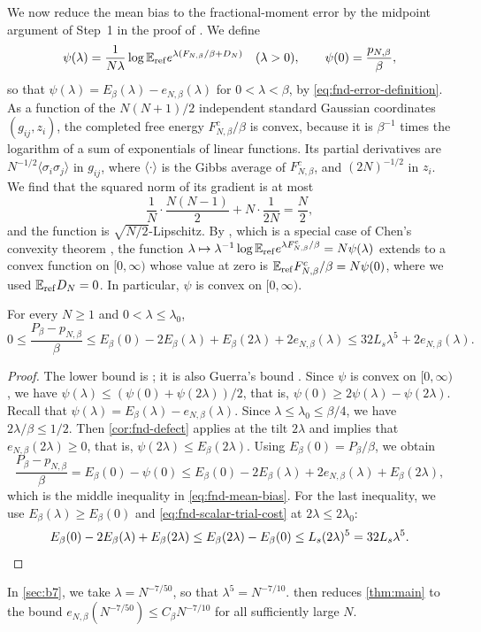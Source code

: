We now reduce the mean bias to the fractional-moment error by the
midpoint argument of Step~1 in the proof of \cite[Theorem~7.8]{AL}. We
define
\[
 \psi(\lambda)=\frac1{N\lambda}
       \log\mathbb E_{\rm ref}e^{\lambda(F_{N,\beta}/\beta+D_N)}\quad(\lambda>0),
 \qquad\psi(0)=\frac{p_{N,\beta}}\beta ,
\]
so that $\psi(\lambda)=E_\beta(\lambda)-e_{N,\beta}(\lambda)$ for
$0<\lambda<\beta$, by \eqref{eq:fnd-error-definition}. As a function
of the $N(N+1)/2$ independent standard Gaussian coordinates
$(g_{ij},z_i)$, the completed free energy $F^c_{N,\beta}/\beta$ is
convex, because it is $\beta^{-1}$ times the logarithm of a sum of
exponentials of linear functions. Its partial derivatives are
$N^{-1/2}\langle\sigma_i\sigma_j\rangle$ in $g_{ij}$, where
$\langle\cdot\rangle$ is the Gibbs average of $F^c_{N,\beta}$, and
$(2N)^{-1/2}$ in $z_i$. We find that the squared norm of its gradient is
at most
\[
 \frac1N\cdot\frac{N(N-1)}2+N\cdot\frac1{2N}=\frac N2,
\]
and the function is $\sqrt{N/2}$-Lipschitz. By \cite[Lemma~5.2]{AL}, which is a
special case of Chen's convexity theorem \cite[Theorem~1]{ChenConvexity},
the function
$\lambda\mapsto\lambda^{-1}\log\mathbb E_{\rm ref}e^{\lambda F^c_{N,\beta}/\beta}=N\psi(\lambda)$
extends to a convex function on $[0,\infty)$ whose value at zero is
$\mathbb E_{\rm ref}F^c_{N,\beta}/\beta=N\psi(0)$, where we used
$\mathbb E_{\rm ref}D_N=0$. In particular, $\psi$ is convex on $[0,\infty)$.

\begin{proposition}\label{prop:fnd-mean-bias}
For every $N\ge1$ and $0<\lambda\le\lambda_0$,
\begin{equation}\label{eq:fnd-mean-bias}
 0\le\frac{P_\beta-p_{N,\beta}}\beta
 \le E_\beta(0)-2E_\beta(\lambda)+E_\beta(2\lambda)
                         +2e_{N,\beta}(\lambda)
 \le 32L_s\lambda^5+2e_{N,\beta}(\lambda).
\end{equation}
\end{proposition}

\begin{proof}
The lower bound is \cite[Theorem~1.1, (1.5)]{AL}; it is also Guerra's
bound \cite{Guerra2003}. Since $\psi$ is convex on $[0,\infty)$, we have
$\psi(\lambda)\le(\psi(0)+\psi(2\lambda))/2$, that is,
$\psi(0)\ge2\psi(\lambda)-\psi(2\lambda)$. Recall that
$\psi(\lambda)=E_\beta(\lambda)-e_{N,\beta}(\lambda)$. Since
$\lambda\le\lambda_0\le\beta/4$, we have $2\lambda/\beta\le1/2$. Then
\cref{cor:fnd-defect} applies at the tilt $2\lambda$ and implies that
$e_{N,\beta}(2\lambda)\ge0$, that is, $\psi(2\lambda)\le E_\beta(2\lambda)$.
Using $E_\beta(0)=P_\beta/\beta$, we obtain
\[
 \frac{P_\beta-p_{N,\beta}}\beta=E_\beta(0)-\psi(0)
 \le E_\beta(0)-2E_\beta(\lambda)+2e_{N,\beta}(\lambda)+E_\beta(2\lambda),
\]
which is the middle inequality in \eqref{eq:fnd-mean-bias}. For the last
inequality, we use $E_\beta(\lambda)\ge E_\beta(0)$ and
\eqref{eq:fnd-scalar-trial-cost} at $2\lambda\le2\lambda_0$:
\[
 E_\beta(0)-2E_\beta(\lambda)+E_\beta(2\lambda)
 \le E_\beta(2\lambda)-E_\beta(0)\le L_s(2\lambda)^5=32L_s\lambda^5 .
 \qedhere
\]
\end{proof}

In \cref{sec:b7}, we take $\lambda=N^{-7/50}$, so that
$\lambda^5=N^{-7/10}$.  then reduces
\cref{thm:main} to the bound $e_{N,\beta}(N^{-7/50})\le C_\beta N^{-7/10}$
for all sufficiently large $N$.
